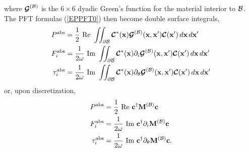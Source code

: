 where $\boldsymbol{\mathcal{G}}^{(\mathcal{B})}$ is the $6\times 6$ dyadic Green's function
for the material interior to $\mathcal{B}$. The PFT formulas (\ref{EPPFT0}) 
then become double surface integrals,
\begin{subequations}
\begin{align}
 P^{\hbox{\scriptsize{abs}}} 
     &= \frac{1}{2}\text{ Re }
      \iint_{\partial \mathcal{B}} 
      \boldsymbol{\mathcal{C}}^*(\mathbf{x}) \boldsymbol{\mathcal{G}}^{(\mathcal{B})}(\mathbf{x}, \mathbf{x}^\prime)
      \boldsymbol{\mathcal{C}}(\mathbf{x}^\prime)
      \,d\mathbf{x}\, d\mathbf{x}^\prime
\\
 F_i^{\hbox{\scriptsize{abs}}} 
     &= \frac{1}{2\omega}\text{ Im }
      \iint_{\partial \mathcal{B}}
      \boldsymbol{\mathcal{C}}^*(\mathbf{x}) \partial_i \boldsymbol{\mathcal{G}}^{(\mathcal{B})}(\mathbf{x}, \mathbf{x}^\prime)
      \boldsymbol{\mathcal{C}}(\mathbf{x}^\prime)
      \,d\mathbf{x} \,d\mathbf{x}^\prime
\\
 \tau_i^{\hbox{\scriptsize{abs}}} 
     &= \frac{1}{2\omega}\text{ Im }
      \iint_{\partial \mathcal{B}}
      \boldsymbol{\mathcal{C}}^*(\mathbf{x}) \partial_\theta \boldsymbol{\mathcal{G}}^{(\mathcal{B})}(\mathbf{x}, \mathbf{x}^\prime)
      \boldsymbol{\mathcal{C}}(\mathbf{x}^\prime)
      \,d\mathbf{x}\, d\mathbf{x}^\prime
\end{align}
\label{EPPFT1}
\end{subequations}
or, upon discretization,
\begin{subequations}
\begin{align}
 P^{\hbox{\scriptsize{abs}}} 
     &= \frac{1}{2}\text{ Re }
      \mathbf{c}^\dagger \mathbf{M}^{(\mathcal{B})} \mathbf{c}
\\
 F_i^{\hbox{\scriptsize{abs}}} 
     &= \frac{1}{2\omega}\text{ Im }
      \mathbf{c}^\dagger \partial_i \mathbf{M}^{(\mathcal{B})} \mathbf{c}
\\
 \tau_i^{\hbox{\scriptsize{abs}}} 
     &= \frac{1}{2\omega}\text{ Im }
      \mathbf{c}^\dagger \partial_\theta \mathbf{M}^{(\mathcal{B})} \mathbf{c}.
\end{align}
\label{EPPFT}
\end{subequations}
